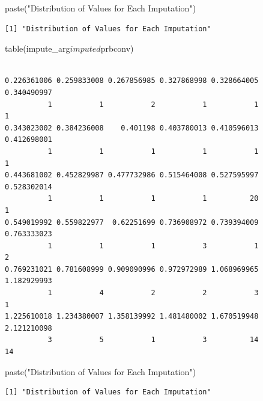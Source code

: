 \documentclass[]{article}
\newenvironment{Shaded}{}{}
\newcommand{\KeywordTok}[1]{\textcolor[rgb]{0.00,0.00,1.00}{#1}}
\newcommand{\NormalTok}[1]{#1}
\newcommand{\OperatorTok}[1]{#1}
\newcommand{\StringTok}[1]{\textcolor[rgb]{0.00,0.50,0.50}{#1}}
\begin{document}
\begin{Shaded}
\begin{Highlighting}[]
\KeywordTok{paste}\NormalTok{(}\StringTok{"Distribution of Values for Each Imputation"}\NormalTok{)}
\end{Highlighting}
\end{Shaded}

\begin{verbatim}
[1] "Distribution of Values for Each Imputation"
\end{verbatim}

\begin{Shaded}
\begin{Highlighting}[]
\KeywordTok{table}\NormalTok{(impute_arg}\OperatorTok{$}\NormalTok{imputed}\OperatorTok{$}\NormalTok{prbconv)}
\end{Highlighting}
\end{Shaded}

\begin{verbatim}

0.226361006 0.259833008 0.267856985 0.327868998 0.328664005 0.340490997 
          1           1           2           1           1           1 
0.343023002 0.384236008    0.401198 0.403780013 0.410596013 0.412698001 
          1           1           1           1           1           1 
0.443681002 0.452829987 0.477732986 0.515464008 0.527595997 0.528302014 
          1           1           1           1          20           1 
0.549019992 0.559822977  0.62251699 0.736908972 0.739394009 0.763333023 
          1           1           1           3           1           2 
0.769231021 0.781608999 0.909090996 0.972972989 1.068969965 1.182929993 
          1           4           2           2           3           1 
1.225610018 1.234380007 1.358139992 1.481480002 1.670519948 2.121210098 
          3           5           1           3          14          14 
\end{verbatim}

\begin{Shaded}
\begin{Highlighting}[]
\KeywordTok{paste}\NormalTok{(}\StringTok{"Distribution of Values for Each Imputation"}\NormalTok{)}
\end{Highlighting}
\end{Shaded}

\begin{verbatim}
[1] "Distribution of Values for Each Imputation"
\end{verbatim}
\end{document}
